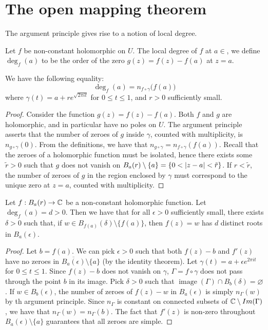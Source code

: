 \section{The open mapping theorem}

The argument principle gives rise to a notion of local degree.

\begin{definition}
  Let $f$ be non-constant holomorphic on $U$.
The local degree of $f$ at $a \in $, we define $\deg_f (a)$ to be the order of the zero $g(z) = f(z) - f(a)$ at $z = a$.
\end{definition}

\begin{lemma}
  We have the following equality:
\[
\deg_f (a) = n_{f \circ \gamma} \bigl(f (a) \bigr)
\]
where $\gamma(t) = a + r e^{\sqrt{2 \pi i t}}$ for $0 \leq t \leq 1$, and $r > 0$ sufficiently small.
\end{lemma}

\begin{proof}
  Consider the function $g(z) = f(z) - f(a)$.
Both $f$ and $g$ are holomorphic, and in particular have no poles on $U$.
The argument principle asserts that the number of zeroes of $g$ inside $\gamma$, counted with multiplicity, is $n_{g \circ \gamma}(0)$.
From the definitions, we have that $n_{g \circ \gamma} = n_{f \circ \gamma}(f(a))$.
Recall that the zeroes of a holomorphic function must be isolated, hence there exists some $\tilde{r} > 0$ such that $g$ does not vanish on $B_a(r) \setminus \{ a \} = \{ 0 < \lvert z - a\rvert < \tilde{r} \}$.
If $r < \tilde{r}$, the number of zeroes of $g$ in the region enclosed by $\gamma$ must correspond to the unique zero at $z = a$, counted with multiplicity.
\end{proof}

\begin{proposition}
  Let $f : B_a(r) \rightarrow \mathbb{C}$ be a non-constant holomorphic function.
Let $\deg_f (a) = d > 0$. Then we have that for all $\epsilon > 0$ sufficiently small, there exists $\delta > 0$ such that, if $w \in B_{f(a)}(\delta) \setminus \{ f(a) \}$, then $f(z) = w$ has $d$ distinct roots in $B_a(\epsilon)$.
\end{proposition}

\begin{proof}
  Let $b = f(a)$. We can pick $\epsilon > 0$ such that both $f(z) - b$ and $f'(z)$ have no zeroes in $\overline{B_a(\epsilon)} \setminus \{ a \}$ (by the identity theorem).
  Let $\gamma(t) = a + \epsilon e^{2 \pi i t}$ for $0 \leq t \leq 1$.
Since $f(z) - b$ does not vanish on $\gamma$, $\Gamma = f \circ \gamma$ does not pass through the point $b$ in its image.
Pick $\delta > 0$ such that $\mathop{image}(\Gamma) \cap B_b(\delta) = \varnothing$.
If $w \in B_b(\epsilon)$, the number of zeroes of $f(z) - w$ in $B_a(\epsilon)$ is simply $n_\Gamma (w)$ by th argument principle.
Since $n_\Gamma$ is constant on connected subsets of $\mathbb{C} \setminus \mathop{Im}(\Gamma)$, we have that $n_\Gamma(w) = n_\Gamma(b)$.
The fact that $f'(z)$ is non-zero throughout $B_a(\epsilon) \setminus \{ a \}$ guarantees that all zeroes are simple.
\end{proof}

